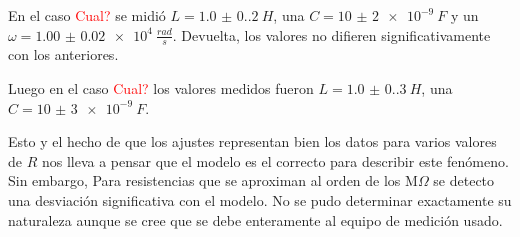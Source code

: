 
En el caso \textcolor{red}{Cual?} se midió $L = \SI{1.0(0.2)}{H}$, una $C = \SI{10(2)e-9}{F}$ y un $\omega = \SI{1.00(2)e4}{\frac{rad}{s}}$. Devuelta, los valores no difieren significativamente con los anteriores.

Luego en el caso \textcolor{red}{Cual?} los valores medidos fueron $L = \SI{1.0(0.3)}{H}$, una $C = \SI{10(3)e-9}{F}$.

Esto y el hecho de que los ajustes representan bien los datos para varios valores de $R$ nos lleva a pensar que el modelo es el correcto para describir este fenómeno. Sin embargo, Para resistencias que se aproximan al orden de los M$\Omega$ se detecto una desviación significativa con el modelo. No se pudo determinar exactamente su naturaleza aunque se cree que se debe enteramente al equipo de medición usado. 
